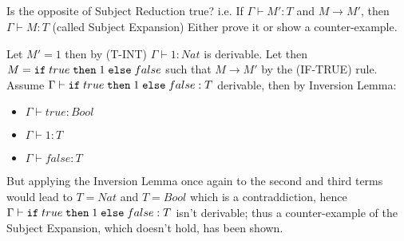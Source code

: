 \subsection{}

Is the opposite of Subject Reduction true? i.e. If $\Gamma \vdash M': T$ and $M \to M'$, then
$\Gamma \vdash M: T$ (called Subject Expansion) Either prove it or show a counter-example.

Let $M' = 1$ then by (T-INT) $\Gamma \vdash 1: Nat$ is derivable.
Let then $M = \texttt{if}\;true\;\texttt{then}\;1\;\texttt{else}\;false$ such that $M \to M'$ by the (IF-TRUE) rule.
Assume $\Gamma \vdash \texttt{if}\;true\;\texttt{then}\;1\;\texttt{else}\;false: T$ derivable, then by Inversion Lemma:
\begin{itemize}
	\item $\Gamma \vdash true: Bool$
	\item $\Gamma \vdash 1: T$
	\item $\Gamma \vdash false: T$
\end{itemize}
But applying the Inversion Lemma once again to the second and third terms would lead to $T = Nat$
and $T = Bool$ which is a contraddiction, hence $\Gamma \vdash \texttt{if}\;true\;\texttt{then}\;1\;\texttt{else}\;false: T$ isn't
derivable; thus a counter-example of the Subject Expansion, which doesn't hold, has been shown.
